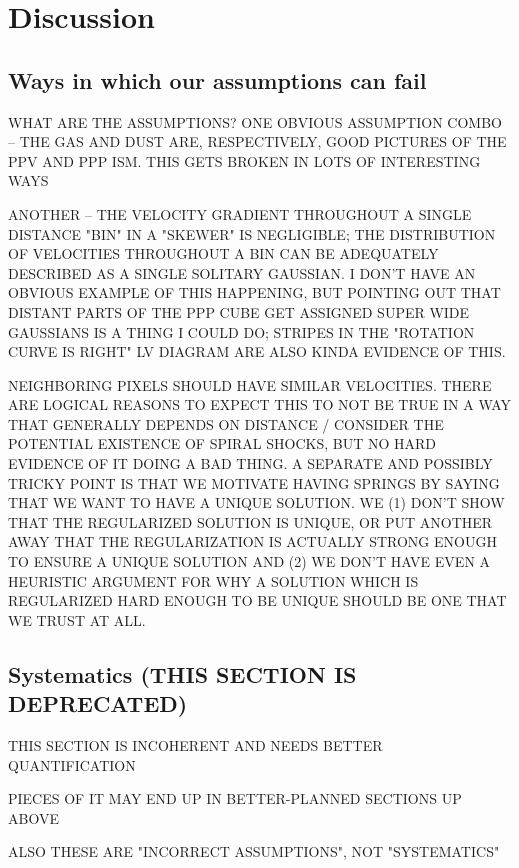 \section{Discussion}
\label{sec:discussion}

\subsection{Ways in which our assumptions can fail}
\label{sec:discussion-systematics}
WHAT ARE THE ASSUMPTIONS?
ONE OBVIOUS ASSUMPTION COMBO -- THE GAS AND DUST ARE, RESPECTIVELY, GOOD PICTURES OF THE PPV AND PPP ISM. THIS GETS BROKEN IN LOTS OF INTERESTING WAYS

ANOTHER -- THE VELOCITY GRADIENT THROUGHOUT A SINGLE DISTANCE "BIN" IN A "SKEWER" IS NEGLIGIBLE; THE DISTRIBUTION OF VELOCITIES THROUGHOUT A BIN CAN BE ADEQUATELY DESCRIBED AS A SINGLE SOLITARY GAUSSIAN. I DON'T HAVE AN OBVIOUS EXAMPLE OF THIS HAPPENING, BUT POINTING OUT THAT DISTANT PARTS OF THE PPP CUBE GET ASSIGNED SUPER WIDE GAUSSIANS IS A THING I COULD DO; STRIPES IN THE "ROTATION CURVE IS RIGHT" LV DIAGRAM ARE ALSO KINDA EVIDENCE OF THIS.

NEIGHBORING PIXELS SHOULD HAVE SIMILAR VELOCITIES. THERE ARE LOGICAL REASONS TO EXPECT THIS TO NOT BE TRUE IN A WAY THAT GENERALLY DEPENDS ON DISTANCE / CONSIDER THE POTENTIAL EXISTENCE OF SPIRAL SHOCKS, BUT NO HARD EVIDENCE OF IT DOING A BAD THING. A SEPARATE AND POSSIBLY TRICKY POINT IS THAT WE MOTIVATE HAVING SPRINGS BY SAYING THAT WE WANT TO HAVE A UNIQUE SOLUTION. WE (1) DON'T SHOW THAT THE REGULARIZED SOLUTION IS UNIQUE, OR PUT ANOTHER AWAY THAT THE REGULARIZATION IS ACTUALLY STRONG ENOUGH TO ENSURE A UNIQUE SOLUTION AND (2) WE DON'T HAVE EVEN A HEURISTIC ARGUMENT FOR WHY A SOLUTION WHICH IS REGULARIZED HARD ENOUGH TO BE UNIQUE SHOULD BE ONE THAT WE TRUST AT ALL.











\subsection{Systematics (THIS SECTION IS DEPRECATED)}
THIS SECTION IS INCOHERENT AND NEEDS BETTER QUANTIFICATION

PIECES OF IT MAY END UP IN BETTER-PLANNED SECTIONS UP ABOVE

ALSO THESE ARE "INCORRECT ASSUMPTIONS", NOT "SYSTEMATICS"

